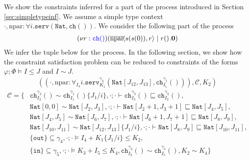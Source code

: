 \begin{example}\label{examp:consinferr}
We show the constraints inferred for a part of the process introduced in Section \ref{sec:simpletypeinf}. We assume a simple type context $\cdot,\text{npar} : \forall i.\texttt{serv}(\texttt{Nat},\texttt{ch}())$. We consider the following part of the process
%
\begin{align*}
    (\nu r : {\color{blue} \texttt{ch}()})( \overline{\text{npar}}\!\langle s(s(0)),r\rangle^{} \mid r()^{}.\mathbf{0} )
\end{align*}
%
We infer the tuple below for the process. In the following section, we show how the constraint satisfaction problem can be reduced to constraints of the forms $\varphi;\Phi\vDash I \leq J$ and $I \sim J$.
%
\begin{align*}
    ((\cdot,\text{npar} : \forall_{I_4}i.\texttt{serv}^{\gamma_4}_{K_1}(\texttt{Nat}[J_{12},J_{13}],\texttt{ch}^{\gamma_1}_{I_1}())),\mathcal{C},K_2) 
\end{align*}
\begin{align*}
    \mathcal{C} = \{&\texttt{ch}^{\gamma_2}_{I_2}()\sim\texttt{ch}^{\gamma_1}_{I_1}()\{J_1/i\}, \cdot;\cdot\vdash \texttt{ch}^{\gamma_3}_{I_3}() \sqsubseteq \texttt{ch}^{\gamma_2}_{I_2}(),\\
    &\texttt{Nat}[0,0] \sim \texttt{Nat}[J_2,J_3], \cdot;\cdot\vdash\texttt{Nat}[J_2 + 1,J_3 + 1] \sqsubseteq \texttt{Nat}[J_4,J_5],\\
    &\texttt{Nat}[J_4,J_5] \sim \texttt{Nat}[J_6,J_7], \cdot;\cdot\vdash \texttt{Nat}[J_6+1,J_7+1] \sqsubseteq \texttt{Nat}[J_8,J_9],\\
    &  \texttt{Nat}[J_{10},J_{11}] \sim \texttt{Nat}[J_{12},J_{13}]\{J_1/i\},\cdot;\cdot\vdash \texttt{Nat}[J_8,J_9] \sqsubseteq \texttt{Nat}[J_{10},J_{11}],\\
    & \{\texttt{out}\} \subseteq \gamma_4, \cdot;\cdot\vDash I_4 + K_1\{J_1/i\} \leq K_2,\\
    & \{\texttt{in}\} \subseteq \gamma_5,\cdot;\cdot\vDash K_3 + I_5 \leq K_4, \texttt{ch}^{\gamma_3}_{I_3}() \sim \texttt{ch}^{\gamma_5}_{I_5}(),K_2 \sim K_4\}
\end{align*}
\end{example}




